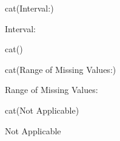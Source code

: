 \documentclass[
]{article}
\newenvironment{Shaded}{\begin{snugshade}}{\end{snugshade}}
\newcommand{\FunctionTok}[1]{\textcolor[rgb]{0.00,0.00,0.00}{#1}}
\newcommand{\NormalTok}[1]{#1}
\newcommand{\StringTok}[1]{\textcolor[rgb]{0.31,0.60,0.02}{#1}}
\begin{document}
\begin{minipage}[t]{0.3\linewidth}

\begin{Shaded}
\begin{Highlighting}[]
\FunctionTok{cat}\NormalTok{(}\StringTok{\textquotesingle{}Interval:\textquotesingle{}}\NormalTok{)}
\end{Highlighting}
\end{Shaded}

Interval:

\end{minipage}%
\begin{minipage}[t]{0.7\linewidth}

\begin{Shaded}
\begin{Highlighting}[]
\FunctionTok{cat}\NormalTok{(}\StringTok{\textquotesingle{}\textquotesingle{}}\NormalTok{)}
\end{Highlighting}
\end{Shaded}

\end{minipage}

\begin{minipage}[t]{0.3\linewidth}

\begin{Shaded}
\begin{Highlighting}[]
\FunctionTok{cat}\NormalTok{(}\StringTok{\textquotesingle{}Range of Missing Values:\textquotesingle{}}\NormalTok{)}
\end{Highlighting}
\end{Shaded}

Range of Missing Values:

\end{minipage}%
\begin{minipage}[t]{0.7\linewidth}

\begin{Shaded}
\begin{Highlighting}[]
\FunctionTok{cat}\NormalTok{(}\StringTok{\textquotesingle{}Not Applicable\textquotesingle{}}\NormalTok{)}
\end{Highlighting}
\end{Shaded}

Not Applicable

\end{minipage}
\end{document}
